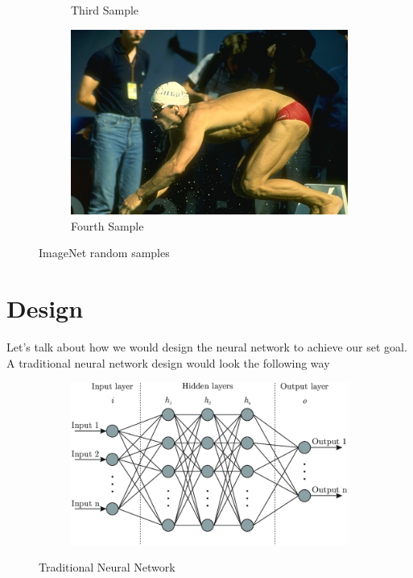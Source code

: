 \documentclass[12pt]{article}
\begin{document}
\begin{figure}[h!]
\begin{subfigure}[b]{0.24\textwidth}
		\caption{Third Sample}
	\end{subfigure}
	\hfill
	\begin{subfigure}[b]{0.24\textwidth}
		\includegraphics[width=\textwidth]{./4.jpg}
		\caption{Fourth Sample}
	\end{subfigure}
	\caption{ImageNet random samples}
\end{figure}

\section*{Design}
\label{sec:org07f2606}
Let's talk about how we would design the neural network to achieve our set goal. A
traditional neural network design would look the following way

\begin{figure}[h!]
	\centering
	\begin{subfigure}[b]{0.75\textwidth}
		\includegraphics[width=\textwidth]{./nn.png}
	\end{subfigure}
	\caption{Traditional Neural Network}
\end{figure}
\end{document}
